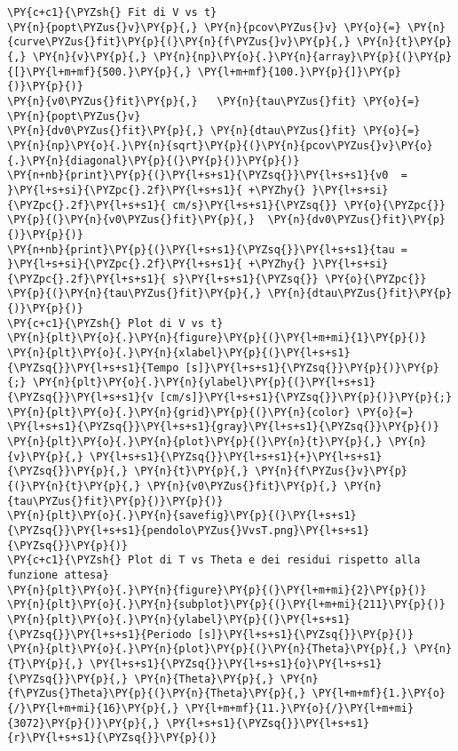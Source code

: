 \begin{Verbatim}[label=\makebox{\href{https://github.com/unipi-physics-labs/lab1-sheets/tree/main/snippy/plasduino_pendulum.py}{https://github.com/.../plasduino\_pendulum.py}},commandchars=\\\{\}]
\PY{c+c1}{\PYZsh{} Fit di V vs t}
\PY{n}{popt\PYZus{}v}\PY{p}{,} \PY{n}{pcov\PYZus{}v} \PY{o}{=} \PY{n}{curve\PYZus{}fit}\PY{p}{(}\PY{n}{f\PYZus{}v}\PY{p}{,} \PY{n}{t}\PY{p}{,} \PY{n}{v}\PY{p}{,} \PY{n}{np}\PY{o}{.}\PY{n}{array}\PY{p}{(}\PY{p}{[}\PY{l+m+mf}{500.}\PY{p}{,} \PY{l+m+mf}{100.}\PY{p}{]}\PY{p}{)}\PY{p}{)}
\PY{n}{v0\PYZus{}fit}\PY{p}{,}   \PY{n}{tau\PYZus{}fit} \PY{o}{=} \PY{n}{popt\PYZus{}v}
\PY{n}{dv0\PYZus{}fit}\PY{p}{,} \PY{n}{dtau\PYZus{}fit} \PY{o}{=} \PY{n}{np}\PY{o}{.}\PY{n}{sqrt}\PY{p}{(}\PY{n}{pcov\PYZus{}v}\PY{o}{.}\PY{n}{diagonal}\PY{p}{(}\PY{p}{)}\PY{p}{)}
\PY{n+nb}{print}\PY{p}{(}\PY{l+s+s1}{\PYZsq{}}\PY{l+s+s1}{v0  = }\PY{l+s+si}{\PYZpc{}.2f}\PY{l+s+s1}{ +\PYZhy{} }\PY{l+s+si}{\PYZpc{}.2f}\PY{l+s+s1}{ cm/s}\PY{l+s+s1}{\PYZsq{}} \PY{o}{\PYZpc{}} \PY{p}{(}\PY{n}{v0\PYZus{}fit}\PY{p}{,}  \PY{n}{dv0\PYZus{}fit}\PY{p}{)}\PY{p}{)}
\PY{n+nb}{print}\PY{p}{(}\PY{l+s+s1}{\PYZsq{}}\PY{l+s+s1}{tau = }\PY{l+s+si}{\PYZpc{}.2f}\PY{l+s+s1}{ +\PYZhy{} }\PY{l+s+si}{\PYZpc{}.2f}\PY{l+s+s1}{ s}\PY{l+s+s1}{\PYZsq{}} \PY{o}{\PYZpc{}} \PY{p}{(}\PY{n}{tau\PYZus{}fit}\PY{p}{,} \PY{n}{dtau\PYZus{}fit}\PY{p}{)}\PY{p}{)}
\PY{c+c1}{\PYZsh{} Plot di V vs t}
\PY{n}{plt}\PY{o}{.}\PY{n}{figure}\PY{p}{(}\PY{l+m+mi}{1}\PY{p}{)}
\PY{n}{plt}\PY{o}{.}\PY{n}{xlabel}\PY{p}{(}\PY{l+s+s1}{\PYZsq{}}\PY{l+s+s1}{Tempo [s]}\PY{l+s+s1}{\PYZsq{}}\PY{p}{)}\PY{p}{;} \PY{n}{plt}\PY{o}{.}\PY{n}{ylabel}\PY{p}{(}\PY{l+s+s1}{\PYZsq{}}\PY{l+s+s1}{v [cm/s]}\PY{l+s+s1}{\PYZsq{}}\PY{p}{)}\PY{p}{;} \PY{n}{plt}\PY{o}{.}\PY{n}{grid}\PY{p}{(}\PY{n}{color} \PY{o}{=} \PY{l+s+s1}{\PYZsq{}}\PY{l+s+s1}{gray}\PY{l+s+s1}{\PYZsq{}}\PY{p}{)}
\PY{n}{plt}\PY{o}{.}\PY{n}{plot}\PY{p}{(}\PY{n}{t}\PY{p}{,} \PY{n}{v}\PY{p}{,} \PY{l+s+s1}{\PYZsq{}}\PY{l+s+s1}{+}\PY{l+s+s1}{\PYZsq{}}\PY{p}{,} \PY{n}{t}\PY{p}{,} \PY{n}{f\PYZus{}v}\PY{p}{(}\PY{n}{t}\PY{p}{,} \PY{n}{v0\PYZus{}fit}\PY{p}{,} \PY{n}{tau\PYZus{}fit}\PY{p}{)}\PY{p}{)}
\PY{n}{plt}\PY{o}{.}\PY{n}{savefig}\PY{p}{(}\PY{l+s+s1}{\PYZsq{}}\PY{l+s+s1}{pendolo\PYZus{}VvsT.png}\PY{l+s+s1}{\PYZsq{}}\PY{p}{)}
\PY{c+c1}{\PYZsh{} Plot di T vs Theta e dei residui rispetto alla funzione attesa}
\PY{n}{plt}\PY{o}{.}\PY{n}{figure}\PY{p}{(}\PY{l+m+mi}{2}\PY{p}{)}
\PY{n}{plt}\PY{o}{.}\PY{n}{subplot}\PY{p}{(}\PY{l+m+mi}{211}\PY{p}{)}
\PY{n}{plt}\PY{o}{.}\PY{n}{ylabel}\PY{p}{(}\PY{l+s+s1}{\PYZsq{}}\PY{l+s+s1}{Periodo [s]}\PY{l+s+s1}{\PYZsq{}}\PY{p}{)} 
\PY{n}{plt}\PY{o}{.}\PY{n}{plot}\PY{p}{(}\PY{n}{Theta}\PY{p}{,} \PY{n}{T}\PY{p}{,} \PY{l+s+s1}{\PYZsq{}}\PY{l+s+s1}{o}\PY{l+s+s1}{\PYZsq{}}\PY{p}{,} \PY{n}{Theta}\PY{p}{,} \PY{n}{f\PYZus{}Theta}\PY{p}{(}\PY{n}{Theta}\PY{p}{,} \PY{l+m+mf}{1.}\PY{o}{/}\PY{l+m+mi}{16}\PY{p}{,} \PY{l+m+mf}{11.}\PY{o}{/}\PY{l+m+mi}{3072}\PY{p}{)}\PY{p}{,} \PY{l+s+s1}{\PYZsq{}}\PY{l+s+s1}{r}\PY{l+s+s1}{\PYZsq{}}\PY{p}{)}

\end{Verbatim}
